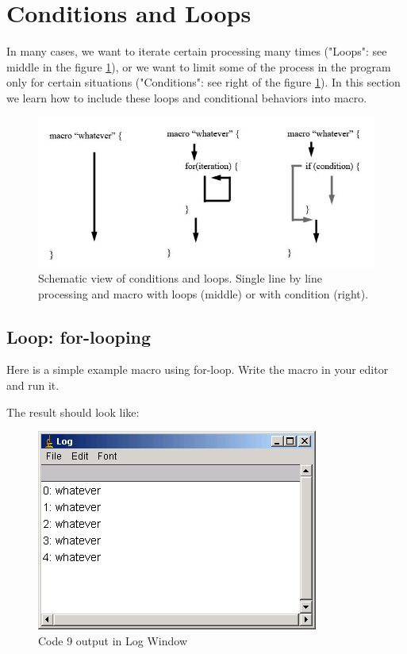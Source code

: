 \documentclass[11pt,a4paper,oneside]{report}
\begin{document}
\section{Conditions and Loops}
In many cases, we want to iterate certain processing many times ("Loops": see middle in the figure \ref{fig_scriptscheme}), or we want to limit some of the process in the program only for certain situations ("Conditions": see right of the figure \ref{fig_scriptscheme}). In this section we learn how to include these loops and conditional behaviors into macro. 

\begin{figure}[htbp]
\begin{center}
\includegraphics[scale=0.55]{fig/fig23_1_ScriptSchemes.png}
\caption{Schematic view of conditions and loops. Single line by line processing and macro with loops (middle) or with condition (right).} \label{fig_scriptscheme}
\end{center}
\end{figure}

\subsection{Loop: for-looping}
Here is a simple example macro using for-loop. Write the macro in your editor and run it. 

The result should look like:

\begin{figure}[htbp]
\begin{center}
\includegraphics[scale=0.6]{fig/fig2311_whatever5.png}
\caption{Code 9 output in Log Window}
\label{fig_whateverOut}
\end{center}
\end{figure}
\end{document}
